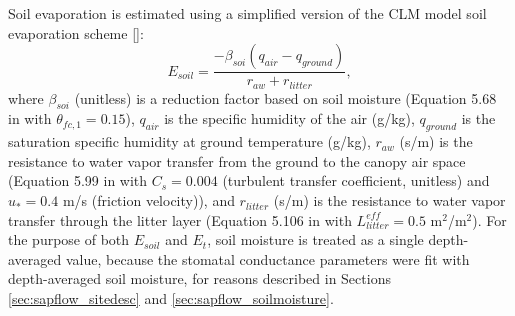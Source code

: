 Soil evaporation is estimated using a simplified version of the CLM model soil evaporation scheme [\cite{oleson2010technical}]:
\begin{equation}
E_{soil} = \frac{-\beta_{soi}(q_{air}-q_{ground})}{r_{aw}+r_{litter}},
\end{equation}
where $\beta_{soi}$ (unitless) is a reduction factor based on soil moisture (Equation 5.68 in \cite{oleson2010technical} with $\theta_{fc,1}=0.15$), $q_{air}$ is the specific humidity of the air (g/kg), $q_{ground}$ is the saturation specific humidity at ground temperature (g/kg), $r_{aw}$ (s/m) is the resistance to water vapor transfer from the ground to the canopy air space (Equation 5.99 in \cite{oleson2010technical} with $C_s=0.004$ (turbulent transfer coefficient, unitless) and $u_*=0.4$ m/s (friction velocity)), and $r_{litter}$ (s/m) is the resistance to water vapor transfer through the litter layer (Equation 5.106 in \cite{oleson2010technical} with $L^{eff}_{litter}=0.5$ m$^2$/m$^2$).  For the purpose of both $E_{soil}$ and $E_t$, soil moisture is treated as a single depth-averaged value, because the stomatal conductance parameters were fit with depth-averaged soil moisture, for reasons described in Sections \ref{sec:sapflow_sitedesc} and \ref{sec:sapflow_soilmoisture}.

